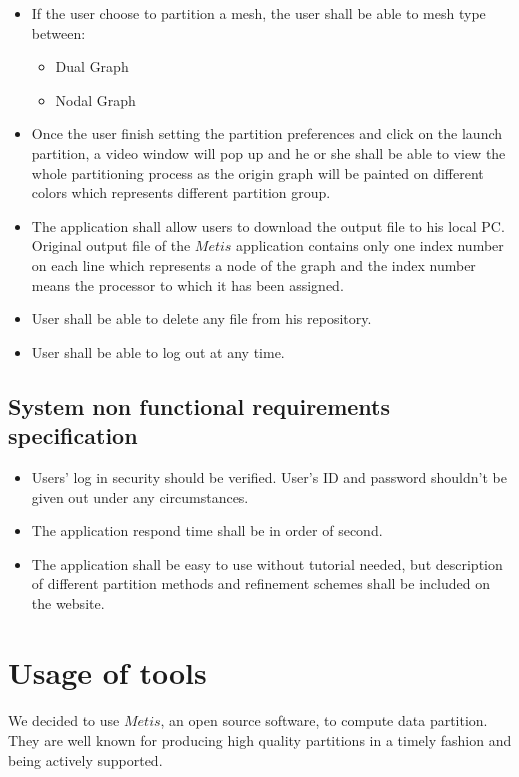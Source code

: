 \documentclass{cranfieldChart}
\begin{document}
\begin{itemize}
    \item If the user choose to partition a mesh, the user shall be able to mesh type between: 
    \begin{itemize}
        \item Dual Graph
        \item Nodal Graph 
    \end{itemize}
    \item Once the user finish setting the partition preferences and click on the launch partition, a video window will pop up and he or she shall be able to view the whole partitioning process as the origin graph will be painted on different colors which represents different partition group. 
    \item The application shall allow users to download the output file to his local PC. Original output file of the $Metis$ application contains only one index number on each line which represents a node of the graph and the index number means the processor to which it has been assigned. 
    \item User shall be able to delete any file from his repository. 
    \item User shall be able to log out at any time. 
\end{itemize}
    
\subsection{System non functional requirements specification}
    \begin{itemize}
        \item Users' log in security should be verified. User's ID and password shouldn't be given out under any circumstances. 
        \item The application respond time shall be in order of second. 
        \item The application shall be easy to use without tutorial needed, but description of different partition methods and refinement schemes shall be included on the website.
     \end{itemize}
     
\section{Usage of tools}
\paragraph{}
We decided to use $Metis$, an open source software, to compute data partition. They are well known for producing high quality partitions in a timely fashion and being actively supported. 
\end{document}
